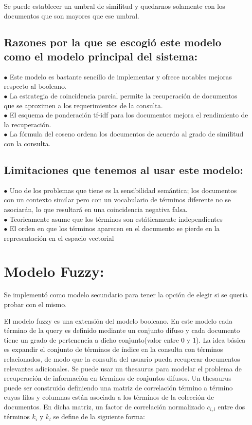 \documentclass{llncs}
\begin{document}
Se puede establecer un umbral de similitud y quedarnos solamente con los documentos que son mayores 
que ese umbral.

\subsection {Razones por la que se escogió este modelo como el modelo principal del sistema:}
\noindent
$\bullet$
Este modelo es bastante sencillo de implementar y ofrece notables mejoras respecto al booleano.\\
\noindent
$\bullet$
La estrategia de coincidencia parcial permite la recuperación de documentos que se aproximen a los 
requerimientos de la consulta. \\
\noindent
$\bullet$
El esquema de ponderación tf-idf para los documentos mejora el 
rendimiento de la recuperación. \\
\noindent
$\bullet$
La fórmula del coseno ordena los documentos 
de acuerdo al grado de similitud con la consulta. 

\subsection {Limitaciones que tenemos al usar este modelo:}
$\bullet$
Uno de los problemas que tiene es la sensibilidad semántica; los documentos con un contexto similar 
pero con un vocabulario de términos diferente no se asociarán, lo que resultará en una coincidencia 
negativa falsa.\\
\noindent
$\bullet$
Teoricamente asume que los términos son estáticamente independientes\\
\noindent
$\bullet$
El orden en que los términos aparecen en el documento se pierde en la representación en el espacio vectorial

\section{Modelo Fuzzy:}
Se implementó como modelo secundario para tener la opción de elegir si se quería probar con el mismo. 

El modelo fuzzy es una extensión del modelo booleano. En este modelo cada término de la query es 
definido mediante un conjunto difuso y cada documento tiene un grado de pertenencia a dicho 
conjunto(valor entre 0 y 1). La idea básica es expandir el conjunto de términos de índice 
en la consulta con términos relacionados, de modo que la consulta del usuario pueda recuperar 
documentos relevantes adicionales. Se puede usar un thesaurus para modelar el problema de recuperación 
de información en términos de conjuntos difusos. Un thesaurus puede ser construido definiendo una 
matriz de correlación término a término cuyas filas y columnas están asociada a los términos  de la
colección de documentos. En dicha matriz, un factor de correlación normalizado $c_{i,l}$ entre 
dos términos $k_{i}$ y $k_{l}$ se define de la siguiente forma:\\
\end{document}
